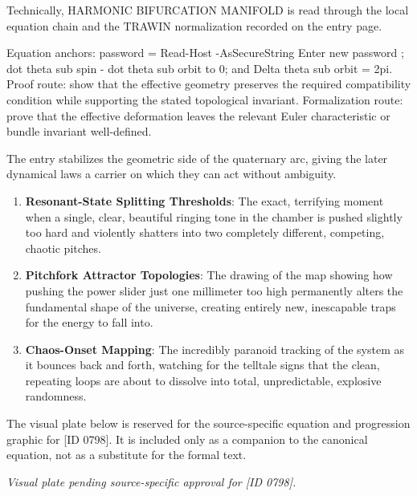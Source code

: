 Technically, HARMONIC BIFURCATION MANIFOLD is read through the local equation chain and the TRAWIN normalization recorded on the entry page.

Equation anchors: password = Read-Host -AsSecureString Enter new password ; dot theta sub spin - dot theta sub orbit to 0; and Delta theta sub orbit = 2pi. Proof route: show that the effective geometry preserves the required compatibility condition while supporting the stated topological invariant. Formalization route: prove that the effective deformation leaves the relevant Euler characteristic or bundle invariant well-defined.

The entry stabilizes the geometric side of the quaternary arc, giving the later dynamical laws a carrier on which they can act without ambiguity.
\endgroup

\begin{enumerate}[leftmargin=1.6em,itemsep=6pt,topsep=4pt]
\item \textbf{Resonant-State Splitting Thresholds}: The exact, terrifying moment when a single, clear, beautiful ringing tone in the chamber is pushed slightly too hard and violently shatters into two completely different, competing, chaotic pitches.
\item \textbf{Pitchfork Attractor Topologies}: The drawing of the map showing how pushing the power slider just one millimeter too high permanently alters the fundamental shape of the universe, creating entirely new, inescapable traps for the energy to fall into.
\item \textbf{Chaos-Onset Mapping}: The incredibly paranoid tracking of the system as it bounces back and forth, watching for the telltale signs that the clean, repeating loops are about to dissolve into total, unpredictable, explosive randomness.
\end{enumerate}

\begingroup\footnotesize\sloppy
The visual plate below is reserved for the source-specific equation and progression graphic for [ID 0798]. It is included only as a companion to the canonical equation, not as a substitute for the formal text.
\par\endgroup
\begingroup\footnotesize\itshape
Visual plate pending source-specific approval for [ID 0798].
\par\endgroup

